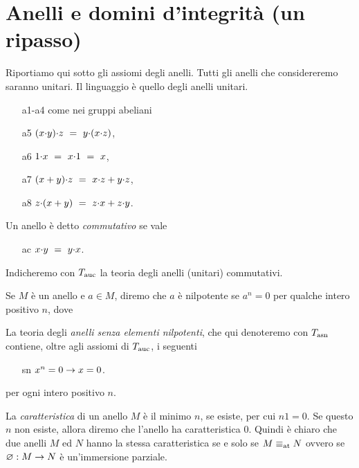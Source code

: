 \section{Anelli e domini d'integrit\`a (un ripasso)}
\label{anelli}
Riportiamo qui sotto gli assiomi degli anelli. Tutti gli anelli che considereremo saranno unitari. Il linguaggio \`e quello degli anelli unitari. 

\begin{itemize}
\item[a1-a4] come nei gruppi abeliani
\item[a5] $(x\mathord\cdot y)\mathord\cdot z\  =\ y\mathord\cdot(x\mathord\cdot z)$,
\item[a6] $1\mathord\cdot x\ =\ x\mathord\cdot 1\ =\ x$,
\item[a7] $(x+y)\mathord\cdot z\ =\ x\mathord\cdot z + y\mathord\cdot z$,
\item[a8] $z\mathord\cdot (x+y)\ =\ z\mathord\cdot x + z\mathord\cdot y$.
\end{itemize}

Un anello \`e detto \emph{commutativo\/} se vale

\begin{itemize}
\item[ac] $x\mathord\cdot y\ =\ y\mathord\cdot x$.
\end{itemize}
 
Indicheremo con \emph{$T_{\rm auc}$} la teoria degli anelli (unitari) commutativi.

Se $M$ \`e un anello e $a\in M$, diremo che $a$ \`e nilpotente se $a^n=0$ per qualche intero positivo $n$, dove 


La teoria degli \emph{anelli senza elementi nilpotenti}, che qui denoteremo con \emph{$T_{\rm asn}$} contiene, oltre agli assiomi di $T_{\rm auc}$, i seguenti

\begin{itemize}
\item[sn] $x^n=0\rightarrow x=0$.
\end{itemize}

per ogni intero positivo $n$.

La \emph{caratteristica\/} di un anello $M$ \`e il minimo $n$, se esiste, per cui $n1=0$. Se questo $n$ non esiste, allora diremo che l'anello ha caratteristica $0$. Quindi \`e chiaro che due anelli $M$ ed $N$  hanno la stessa caratteristica se e solo se $M\equiv_{\rm at}N$ ovvero se $\varnothing:M\rightarrow N$ \`e un'immersione parziale.

